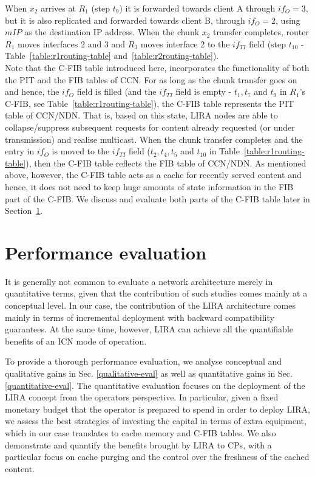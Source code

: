 \documentclass{sig-alternate}
\begin{document}
 
When $x_2$ arrives at $R_1$ (step $t_9$) it is forwarded towards client A through $if_O = 3$, but it is also replicated and forwarded towards client B, through $if_O = 2$, using $mIP$ as the destination IP address. When the chunk $x_2$ transfer completes, router $R_1$ moves interfaces 2 and 3 and $R_3$ moves interface 2 to the $if_{TI}$ field (step $t_{10}$ - Table~\ref{table:r1routing-table} and~\ref{table:r2routing-table}).
\\[0.2cm]
Note that the C-FIB table introduced here, incorporates the functionality of both the PIT and the FIB tables of CCN. For as long as the chunk transfer goes on and hence, the $if_O$ field is filled (and the $if_{TI}$ field is empty - $t_1, t_7$ and $t_9$ in $R_1$'s C-FIB, see Table~\ref{table:r1routing-table}), the C-FIB table represents the PIT table of CCN/NDN. That is, based on this state, LIRA nodes are able to collapse/suppress subsequent requests for content already requested (or under transmission) and realise multicast. When the chunk transfer completes and the entry in $if_O$ is moved to the $if_{TI}$ field ($t_2, t_4, t_5$ and $t_{10}$ in Table~\ref{table:r1routing-table}), then the C-FIB table reflects the FIB table of CCN/NDN. As mentioned above, however, the C-FIB table acts as a cache for recently served content and hence, it does not need to keep huge amounts of state information in the FIB part of the C-FIB. We discuss and evaluate both parts of the C-FIB table later in Section~\ref{eval}.





 




\makeatletter{}
\section{Performance evaluation}\label{eval}

It is generally not common to evaluate a network architecture merely in quantitative terms, given that the contribution of such studies comes mainly at a conceptual level.
In our case, the contribution of the LIRA architecture comes mainly in terms of incremental deployment with backward compatibility guarantees.
At the same time, however, LIRA can achieve all the quantifiable benefits of an ICN mode of operation.

To provide a thorough performance evaluation, we analyse conceptual and qualitative gains in Sec. \ref{qualitative-eval} as well as quantitative gains in Sec. \ref{quantitative-eval}.
The quantitative evaluation focuses on the deployment of the LIRA concept from the operators perspective. 
In particular, given a fixed monetary budget that the operator is prepared to spend in order to deploy LIRA, we assess the best strategies of investing the capital in terms of extra equipment, which in our case translates to cache memory and C-FIB tables. 
We also demonstrate and quantify the benefits brought by LIRA to CPs, with a particular focus on cache purging and the control over the freshness of the cached content. 
\end{document}
